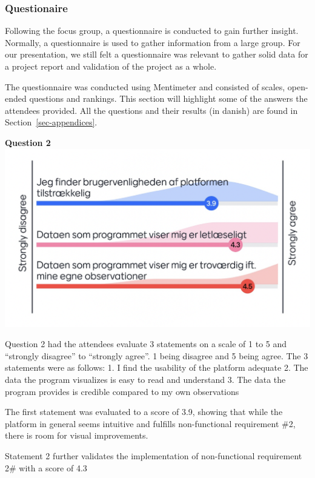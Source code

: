 \documentclass[
]{article}
\begin{document}
\hypertarget{questionaire}{%
\subsubsection{Questionaire}\label{questionaire}}

Following the focus group, a questionnaire is conducted to gain further
insight. Normally, a questionnaire is used to gather information from a
large group. For our presentation, we still felt a questionnaire was
relevant to gather solid data for a project report and validation of the
project as a whole.

The questionnaire was conducted using Mentimeter and consisted of
scales, open-ended questions and rankings. This section will highlight
some of the answers the attendees provided. All the questions and their
results (in danish) are found in Section~\ref{sec-appendices}.

\textbf{Question 2} \includegraphics{../images/Evaluation_question2.png}

Question 2 had the attendees evaluate 3 statements on a scale of 1 to 5
and ``strongly disagree'' to ``strongly agree''. 1 being disagree and 5
being agree. The 3 statements were as follows: 1. I find the usability
of the platform adequate 2. The data the program visualizes is easy to
read and understand 3. The data the program provides is credible
compared to my own observations

The first statement was evaluated to a score of 3.9, showing that while
the platform in general seems intuitive and fulfills non-functional
requirement \#2, there is room for visual improvements.

Statement 2 further validates the implementation of non-functional
requirement 2\# with a score of 4.3
\end{document}
